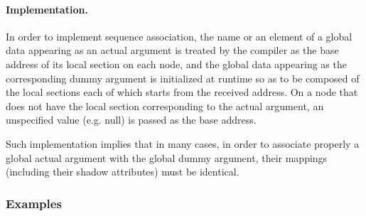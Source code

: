 \paragraph{Implementation.}

In order to implement sequence association, the name or an element
of a global data appearing as an actual argument is treated by the
{\XMP} compiler as the base address of its local section on each node,
and the global data appearing as the corresponding dummy argument is
initialized at runtime so as to be composed of the local sections each
of which starts from the received address.
%
On a node that does not have the local section corresponding to the
actual argument, an unspecified value (e.g. null) is passed as the base
address.

Such implementation implies that in many cases, in order to associate
properly a global actual argument with the global dummy argument, their
mappings (including their shadow attributes) must be identical.


\subsubsection*{Examples}


